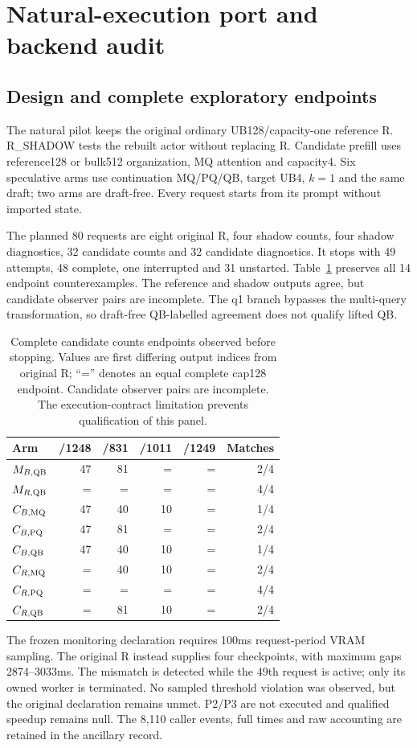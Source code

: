\section{Natural-execution port and backend audit}
\label{supp:pilot}
\subsection{Design and complete exploratory endpoints}
The natural pilot keeps the original ordinary UB128/capacity-one reference R. R\_SHADOW tests the rebuilt actor without replacing R. Candidate prefill uses reference128 or bulk512 organization, MQ attention and capacity4. Six speculative arms use continuation MQ/PQ/QB, target UB4, $k=1$ and the same draft; two arms are draft-free. Every request starts from its prompt without imported state.

The planned 80 requests are eight original R, four shadow counts, four shadow diagnostics, 32 candidate counts and 32 candidate diagnostics. It stops with 49 attempts, 48 complete, one interrupted and 31 unstarted. Table~\ref{tab:pilot} preserves all 14 endpoint counterexamples. The reference and shadow outputs agree, but candidate observer pairs are incomplete. The q1 branch bypasses the multi-query transformation, so draft-free QB-labelled agreement does not qualify lifted QB.
\begin{table}[t]\centering\small
\caption{Complete candidate counts endpoints observed before stopping. Values are first differing output indices from original R; ``='' denotes an equal complete cap128 endpoint. Candidate observer pairs are incomplete. The execution-contract limitation prevents qualification of this panel.}
\label{tab:pilot}
\begin{tabular}{@{}lrrrrr@{}}\toprule
Arm&/1248&/831&/1011&/1249&Matches\\\midrule
$M_{B,\mathrm{QB}}$&47&81&=&=&2/4\\
$M_{R,\mathrm{QB}}$&=&=&=&=&4/4\\
$C_{B,\mathrm{MQ}}$&47&40&10&=&1/4\\
$C_{B,\mathrm{PQ}}$&47&81&=&=&2/4\\
$C_{B,\mathrm{QB}}$&47&40&10&=&1/4\\
$C_{R,\mathrm{MQ}}$&=&40&10&=&2/4\\
$C_{R,\mathrm{PQ}}$&=&=&=&=&4/4\\
$C_{R,\mathrm{QB}}$&=&81&10&=&2/4\\\bottomrule
\end{tabular}
\end{table}
The frozen monitoring declaration requires 100ms request-period VRAM sampling. The original R instead supplies four checkpoints, with maximum gaps 2874--3033ms. The mismatch is detected while the 49th request is active; only its owned worker is terminated. No sampled threshold violation was observed, but the original declaration remains unmet. P2/P3 are not executed and qualified speedup remains null. The 8,110 caller events, full times and raw accounting are retained in the ancillary record.

